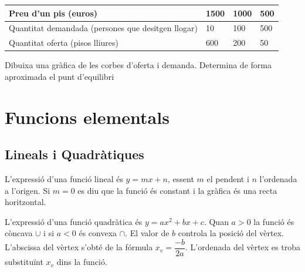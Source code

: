 \begin{mylist}
\begin{tabular}{|p{2.5in}|p{0.6in}|p{0.6in}|p{0.6in}|} \hline 
	Preu d'un pis (euros) & 1500 & 1000 & 500 \\ \hline 
	Quantitat demandada (persones que desitgen llogar) & 10 & 100 & 500 \\ \hline 
	Quantitat oferta (pisos lliures) & 600 & 200 & 50 \\ \hline 
\end{tabular}

\begin{tasks}
	\task  Dibuixa una gràfica de les corbes d'oferta i demanda.
	\task  Determina de forma aproximada el punt d'equilibri
\end{tasks}




\end{mylist}

\section{Funcions elementals}
\vspace{-0.6cm} 
\subsection{Lineals i Quadràtiques}
\vspace{-0.4cm}
\begin{theorybox}
	L'expressió d'una funció lineal és $y=mx+n$, essent $m$ el pendent i $n$ l'ordenada a l'origen. Si $m=0$ es diu que la funció és constant i la gràfica és una recta horitzontal.
\end{theorybox}

\begin{theorybox}
	L'expressió d'una funció quadràtica és $y=ax^2+bx+c$. Quan $a>0$ la funció és còncava $\cup$ i si $a<0$ és convexa $\cap$. El valor de $b$ controla la posició del vèrtex. L'abscissa del vèrtex s'obté de la fórmula $x_v=\dfrac{-b}{2a}$. L'ordenada del vèrtex es troba substituïnt $x_v$ dins la funció.
\end{theorybox}


